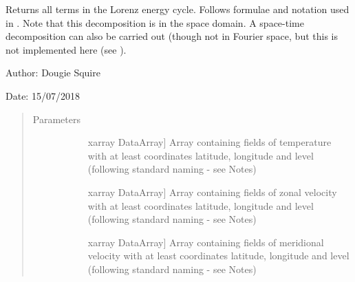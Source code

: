 \documentclass[letterpaper,10pt,english]{sphinxmanual}
\begin{document}

\begin{fulllineitems}
\label{\detokenize{diagnostic_doc:diagnostic.atmos_energy_cycle}}
Returns all terms in the Lorenz energy cycle. Follows formulae and notation used in . Note that this decomposition is in the space domain. A space-time decomposition                 can also be carried out (though not in Fourier space, but this is not implemented here (see                 ).

\begin{DUlineblock}{0em}
\item[] Author: Dougie Squire
\item[] Date: 15/07/2018
\end{DUlineblock}
\begin{quote}\begin{description}
\item[{Parameters}] \leavevmode\begin{description}
\item[{}] \leavevmode{[}xarray DataArray{]}
Array containing fields of temperature with at least coordinates latitude, longitude                     and level (following standard naming - see Notes)

\item[{}] \leavevmode{[}xarray DataArray{]}
Array containing fields of zonal velocity with at least coordinates latitude, longitude                     and level (following standard naming - see Notes)

\item[{}] \leavevmode{[}xarray DataArray{]}
Array containing fields of meridional velocity with at least coordinates latitude, longitude                     and level (following standard naming - see Notes)


\end{description}
\end{description}
\end{quote}
\end{fulllineitems}
\end{document}
